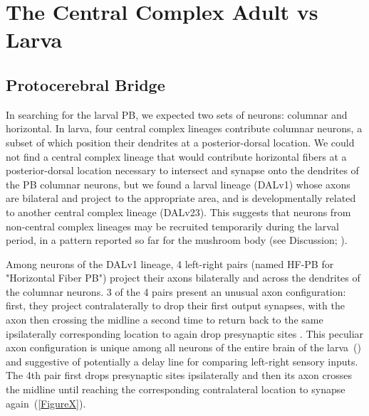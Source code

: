 
    


\section{The Central Complex Adult vs Larva}

    \subsection{Protocerebral Bridge}
    \label{PB}
    In searching for the larval PB, we expected two sets of neurons: columnar and horizontal. In larva, four central complex lineages contribute columnar neurons, a subset of which position their dendrites at a posterior-dorsal location. We could not find a central complex lineage that would contribute horizontal fibers at a posterior-dorsal location necessary to intersect and synapse onto the dendrites of the PB columnar neurons, but we found a larval lineage (DALv1) whose axons are bilateral and project to the appropriate area, and is developmentally related to another central complex lineage (DALv23). This suggests that neurons from non-central complex lineages may be recruited temporarily during the larval period, in a pattern reported so far for the mushroom body (see Discussion; \citep{truman2023metamorphosis}). 

    Among neurons of the DALv1 lineage, 4 left-right pairs (named HF-PB for "Horizontal Fiber PB") project their axons bilaterally and across the dendrites of the columnar neurons.
    3 of the 4 pairs present an unusual axon configuration: first, they project contralaterally to drop their first output synapses, with the axon then crossing the midline a second time to return back to the same ipsilaterally corresponding location to again drop presynaptic sites .
    This peculiar axon configuration is unique among all neurons of the entire brain of the larva~(\citep{winding2023connectome}) and suggestive of potentially a delay line for comparing left-right sensory inputs.
    The 4th pair first drops presynaptic sites ipsilaterally and then its axon crosses the midline until reaching the corresponding contralateral location to synapse again~(\ref{FigureX}).


